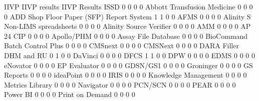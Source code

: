 \documentclass{article}
\begin{document}
\begin{Schunk}
\begin{Soutput}
                                           IIVP IIVP results IIVP Results ISSD
                                              0            0            0    0
  Abbott Transfusion Medicine                 0            0            0    0
  ADD Shop Floor Paper (SFP) Report System    1            1            0    0
  AFMS                                        0            0            0    0
  Alinity S Non-LIMS spreadsheets             0            0            0    0
  Alinity Source Verifier                     0            0            0    0
  AMM                                         0            0            0    0
  AP 24 CIP                                   0            0            0    0
  Apollo/PHM                                  0            0            0    0
  Assay File Database                         0            0            0    0
  BioCommand Batch Control Plus               0            0            0    0
  CMSnext                                     0            0            0    0
  CMSNext                                     0            0            0    0
  DARA Filler DHM and RU                      0            1            0    0
  DaVinci                                     0            0            0    0
  DFCS                                        1            1            0    0
  DPW                                         0            0            0    0
  EDMS                                        0            0            0    0
  eNovator                                    0            0            0    0
  EP Evaluator                                0            0            0    0
  GDSN/GS1                                    0            0            0    0
  Groninger                                   0            0            0    0
  GS Reports                                  0            0            0    0
  ideaPoint                                   0            0            0    0
  IRIS                                        0            0            0    0
  Knowledge Management                        0            0            0    0
  Metrics Library                             0            0            0    0
  Navigator                                   0            0            0    0
  PCN/SCN                                     0            0            0    0
  PEAR                                        0            0            0    0
  Power BI                                    0            0            0    0
  Print on Demand                             0            0            0    0

\end{Soutput}
\end{Schunk}
\end{document}
